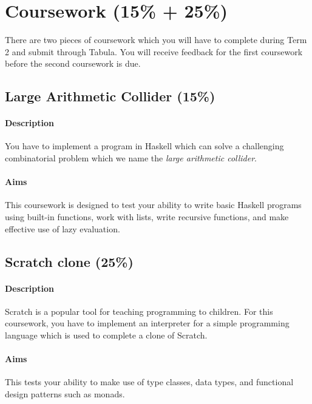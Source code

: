 \pagebreak
\section{Coursework (15\% + 25\%)}

There are two pieces of coursework which you will have to complete during Term 2 and submit through Tabula. You will receive feedback for the first coursework before the second coursework is due.

\subsection{Large Arithmetic Collider (15\%)}

\paragraph{Description} You have to implement a program in Haskell which can solve a challenging combinatorial problem which we name the \emph{large arithmetic collider}. 

\paragraph{Aims} This coursework is designed to test your ability to write basic Haskell programs using built-in functions, work with lists, write recursive functions, and make effective use of lazy evaluation. 

\subsection{Scratch clone (25\%)}

\paragraph{Description} Scratch is a popular tool for teaching programming to children. For this coursework, you have to implement an interpreter for a simple programming language which is used to complete a clone of Scratch. 

\paragraph{Aims} This tests your ability to make use of type classes, data types, and functional design patterns such as monads.